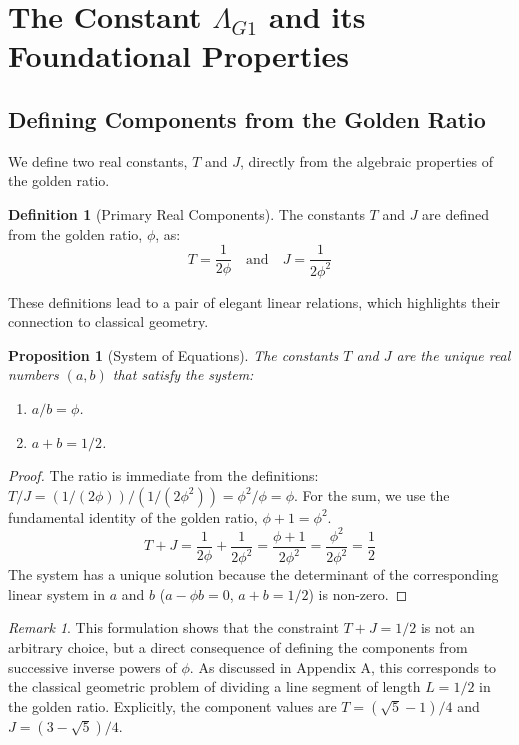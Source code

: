 \documentclass{amsart}
\theoremstyle{plain}
\newtheorem{proposition}[theorem]{Proposition}
\theoremstyle{definition}
\newtheorem{definition}[theorem]{Definition}
\theoremstyle{remark}
\newtheorem*{remark}{Remark}
\begin{document}
\section{The Constant \texorpdfstring{$\Lambda_{G1}$}{Lambda\_G1} and its Foundational Properties}

\subsection{Defining Components from the Golden Ratio}
We define two real constants, $T$ and $J$, directly from the algebraic properties of the golden ratio.

\begin{definition}[Primary Real Components]
The constants $T$ and $J$ are defined from the golden ratio, $\phi$, as:
$$ T = \frac{1}{2\phi} \quad \text{and} \quad J = \frac{1}{2\phi^2} $$
\end{definition}

These definitions lead to a pair of elegant linear relations, which highlights their connection to classical geometry.

\begin{proposition}[System of Equations]
The constants $T$ and $J$ are the unique real numbers $(a,b)$ that satisfy the system:
\begin{enumerate}
    \item $a/b = \phi$.
    \item $a+b = 1/2$.
\end{enumerate}
\end{proposition}
\begin{proof}
The ratio is immediate from the definitions: $T/J = (1/(2\phi))/(1/(2\phi^2)) = \phi^2/\phi = \phi$.
For the sum, we use the fundamental identity of the golden ratio, $\phi+1 = \phi^2$.
$$ T+J = \frac{1}{2\phi} + \frac{1}{2\phi^2} = \frac{\phi+1}{2\phi^2} = \frac{\phi^2}{2\phi^2} = \frac{1}{2} $$
The system has a unique solution because the determinant of the corresponding linear system in $a$ and $b$ ($a - \phi b = 0$, $a+b=1/2$) is non-zero.
\end{proof}

\begin{remark}
This formulation shows that the constraint $T+J=1/2$ is not an arbitrary choice, but a direct consequence of defining the components from successive inverse powers of $\phi$. As discussed in Appendix A, this corresponds to the classical geometric problem of dividing a line segment of length $L=1/2$ in the golden ratio. Explicitly, the component values are $T = (\sqrt{5}-1)/4$ and $J = (3-\sqrt{5})/4$.
\end{remark}
\end{document}
